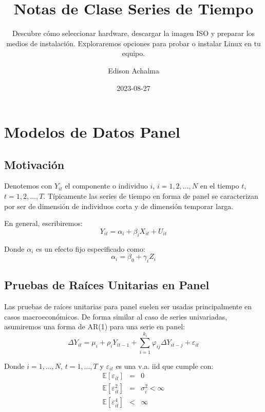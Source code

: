 \documentclass[
  a4paper,
]{article}
\title{Notas de Clase Series de Tiempo}
\subtitle{Descubre cómo seleccionar hardware, descargar la imagen ISO y
preparar los medios de instalación. Exploraremos opciones para probar o
instalar Linux en tu equipo.}
\author{Edison Achalma}
\date{2023-08-27}
\begin{document}
\maketitle
\ifdefined\Shaded\renewenvironment{Shaded}{\begin{tcolorbox}[sharp corners, interior hidden, enhanced, breakable, frame hidden, boxrule=0pt, borderline west={3pt}{0pt}{shadecolor}]}{\end{tcolorbox}}\fi

\hypertarget{modelos-de-datos-panel}{%
\section{Modelos de Datos Panel}\label{modelos-de-datos-panel}}

\hypertarget{motivaciuxf3n}{%
\subsection{Motivación}\label{motivaciuxf3n}}

Denotemos con \(Y_{it}\) el componente o individuo \(i\),
\(i = 1, 2, \ldots, N\) en el tiempo \(t\), \(t = 1, 2, \ldots, T\).
Típicamente las series de tiempo en forma de panel se caracterizan por
ser de dimensión de individuos corta y de dimensión temporar larga.

En general, escribiremos: \[
    Y_{it} = \alpha_i + \beta_i X_{it} + U_{it}
\]

Donde \(\alpha_i\) es un efecto fijo especificado como: \[
    \alpha_i = \beta_0 + \gamma_i Z_i
\]

\hypertarget{pruebas-de-rauxedces-unitarias-en-panel}{%
\subsection{Pruebas de Raíces Unitarias en
Panel}\label{pruebas-de-rauxedces-unitarias-en-panel}}

Las pruebas de raíces unitarias para panel suelen ser usadas
principalmente en casos macroeconómicos. De forma similar al caso de
series univariadas, asumiremos una forma de AR(1) para una serie en
panel: \[
    \Delta Y_{it} = \mu_i + \rho_i Y_{i t-1} + \sum_{i = 1}^{k_i} \varphi_{ij} \Delta Y_{i t-j} + \varepsilon_{it}
    \label{eq_AR_Panel}
\]

Donde \(i = 1, \ldots, N\), \(t = 1, \ldots, T\) y \(\varepsilon_{it}\)
es una v.a. iid que cumple con: \begin{eqnarray*}
    \mathbb{E}[\varepsilon_{it}] & = & 0 \\
    \mathbb{E}[\varepsilon_{it}^2] & = & \sigma^2_i < \infty \\
    \mathbb{E}[\varepsilon_{it}^4] & < & \infty 
\end{eqnarray*}
\end{document}
